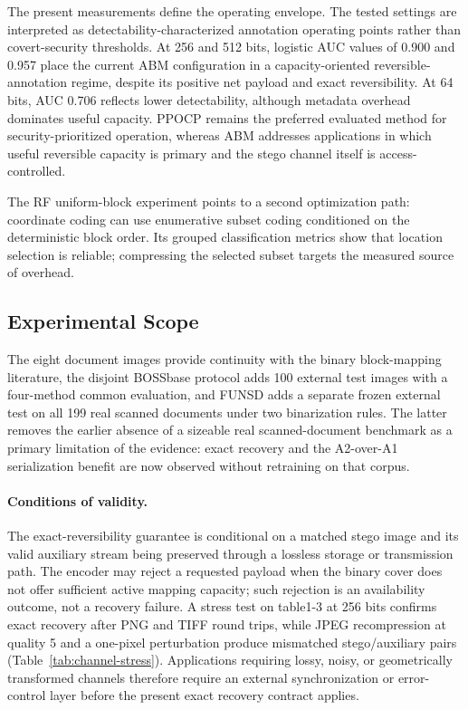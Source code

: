 \RevisionAddBegin
The present measurements define the operating envelope. The tested settings
are interpreted as detectability-characterized annotation operating points
rather than covert-security thresholds. At 256 and 512 bits, logistic AUC
values of 0.900 and 0.957 place the current ABM configuration in a
capacity-oriented reversible-annotation regime, despite its positive net
payload and exact reversibility. At 64 bits, AUC 0.706 reflects lower
detectability, although metadata overhead dominates useful capacity. PPOCP remains the
\RevisionAddEnd
preferred evaluated method for security-prioritized operation, whereas ABM
addresses applications in which useful reversible capacity is primary and
the stego channel itself is access-controlled.

\RevisionAddBegin
The RF uniform-block experiment points to a second optimization path:
\RevisionAddEnd
coordinate coding can use enumerative subset coding conditioned on the
deterministic block order. Its grouped classification metrics show that
location selection is reliable; compressing the selected subset targets the
measured source of overhead.

\subsection{Experimental Scope}
\label{subsec:scope}

\RevisionAddBegin
The eight document images provide continuity with the binary block-mapping
literature, the disjoint BOSSbase protocol adds 100 external test images with a
four-method common evaluation, and FUNSD adds a separate frozen external test
on all 199 real scanned documents under two binarization rules. The latter
removes the earlier absence of a sizeable real scanned-document benchmark as a
primary limitation of the evidence: exact recovery and the A2-over-A1
serialization benefit are now observed without retraining on that corpus.

\paragraph{Conditions of validity.}
The exact-reversibility guarantee is conditional on a matched stego image and
its valid auxiliary stream being preserved through a lossless storage or
transmission path. The encoder may reject a requested payload when the binary
cover does not offer sufficient active mapping capacity; such rejection is an
availability outcome, not a recovery failure. A stress test on table1-3 at 256
bits confirms exact recovery after PNG and TIFF round trips, while JPEG
recompression at quality 5 and a one-pixel perturbation produce mismatched
stego/auxiliary pairs (Table~\ref{tab:channel-stress}). Applications requiring
lossy, noisy, or geometrically transformed channels therefore require an
external synchronization or error-control layer before the present exact
recovery contract applies.

